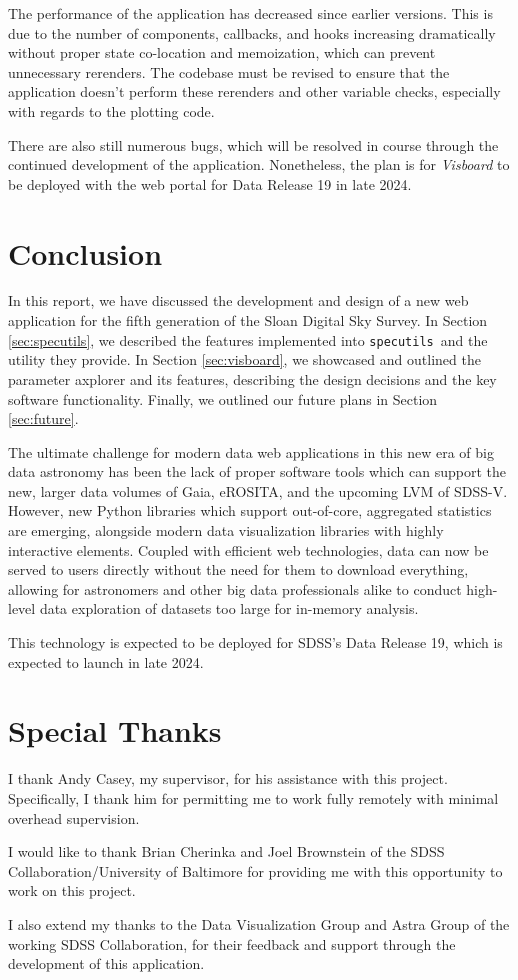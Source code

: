 \documentclass[a4paper,10pt,twocolumn]{article}
\newcommand{\specutils}{\texttt{specutils}}
\begin{document}
The performance of the application has decreased since earlier versions. This is due to the number of components, callbacks, and hooks increasing dramatically without proper state co-location and memoization, which can prevent unnecessary rerenders. The codebase must be revised to ensure that the application doesn't perform these rerenders and other variable checks, especially with regards to the plotting code.

There are also still numerous bugs, which will be resolved in course through the continued development of the application. Nonetheless, the plan is for \emph{Visboard} to be deployed with the web portal for Data Release 19 in late 2024.

\section{Conclusion}
\label{sec:conclusion}
In this report, we have discussed the development and design of a new web application for the fifth generation of the Sloan Digital Sky Survey. In Section \ref{sec:specutils}, we described the features implemented into \specutils\, and the utility they provide. In Section \ref{sec:visboard}, we showcased and outlined the parameter axplorer and its features, describing the design decisions and the key software functionality. Finally, we outlined our future plans in Section \ref{sec:future}.

The ultimate challenge for modern data web applications in this new era of big data astronomy has been the lack of proper software tools which can support the new, larger data volumes of Gaia, eROSITA, and the upcoming LVM of SDSS-V. However, new Python libraries which support out-of-core, aggregated statistics are emerging, alongside modern data visualization libraries with highly interactive elements. Coupled with efficient web technologies, data can now be served to users directly without the need for them to download everything, allowing for astronomers and other big data professionals alike to conduct high-level data exploration of datasets too large for in-memory analysis.

This technology is expected to be deployed for SDSS's Data Release 19, which is expected to launch in late 2024.

\section*{Special Thanks}
I thank Andy Casey, my supervisor, for his assistance with this project. Specifically, I thank him for permitting me to work fully remotely with minimal overhead supervision.

I would like to thank Brian Cherinka and Joel Brownstein of the SDSS Collaboration/University of Baltimore for providing me with this opportunity to work on this project.

I also extend my thanks to the Data Visualization Group and Astra Group of the working SDSS Collaboration, for their feedback and support through the development of this application.
\printbibliography
\end{document}
